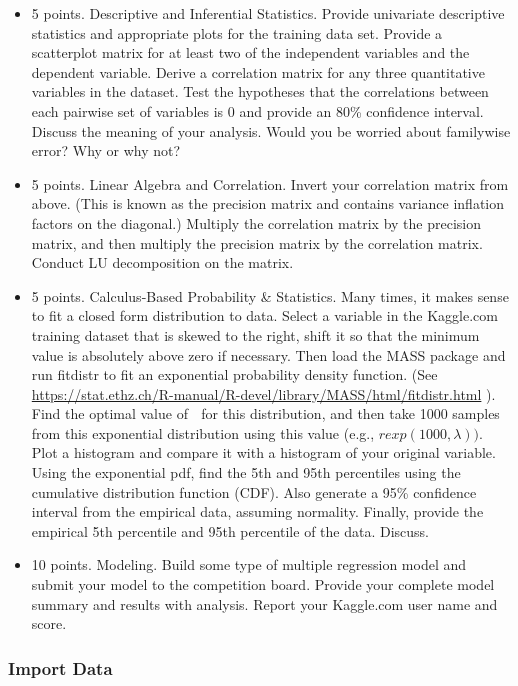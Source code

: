 \documentclass[]{article}
\begin{document}
\begin{itemize}
\item
  5 points. Descriptive and Inferential Statistics. Provide univariate
  descriptive statistics and appropriate plots for the training data
  set. Provide a scatterplot matrix for at least two of the independent
  variables and the dependent variable. Derive a correlation matrix for
  any three quantitative variables in the dataset. Test the hypotheses
  that the correlations between each pairwise set of variables is 0 and
  provide an 80\% confidence interval. Discuss the meaning of your
  analysis. Would you be worried about familywise error? Why or why not?
\item
  5 points. Linear Algebra and Correlation. Invert your correlation
  matrix from above. (This is known as the precision matrix and contains
  variance inflation factors on the diagonal.) Multiply the correlation
  matrix by the precision matrix, and then multiply the precision matrix
  by the correlation matrix. Conduct LU decomposition on the matrix.
\item
  5 points. Calculus-Based Probability \& Statistics. Many times, it
  makes sense to fit a closed form distribution to data. Select a
  variable in the Kaggle.com training dataset that is skewed to the
  right, shift it so that the minimum value is absolutely above zero if
  necessary. Then load the MASS package and run fitdistr to fit an
  exponential probability density function. (See
  \url{https://stat.ethz.ch/R-manual/R-devel/library/MASS/html/fitdistr.html}
  ). Find the optimal value of  for this distribution, and then take
  1000 samples from this exponential distribution using this value
  (e.g., \(rexp(1000, \lambda))\). Plot a histogram and compare it with
  a histogram of your original variable. Using the exponential pdf, find
  the 5th and 95th percentiles using the cumulative distribution
  function (CDF). Also generate a 95\% confidence interval from the
  empirical data, assuming normality. Finally, provide the empirical 5th
  percentile and 95th percentile of the data. Discuss.
\item
  10 points. Modeling. Build some type of multiple regression model and
  submit your model to the competition board. Provide your complete
  model summary and results with analysis. Report your Kaggle.com user
  name and score.
\end{itemize}

\hypertarget{import-data}{%
\subsubsection{Import Data}\label{import-data}}
\end{document}
